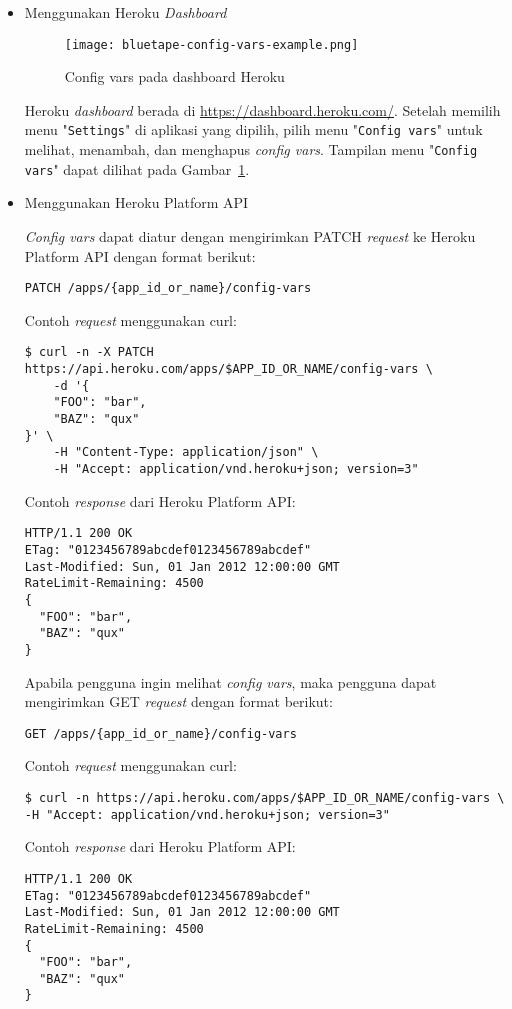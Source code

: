 \begin{itemize}
\item Menggunakan Heroku \textit{Dashboard}
\begin{figure}[H]
	\centering  
	\texttt{[image: bluetape-config-vars-example.png]}  
	\caption[Config vars pada dashboard Heroku]{Config vars pada dashboard Heroku} 
	\label{fig:bluetape-config-vars-example} 
\end{figure}

Heroku \textit{dashboard} berada di \url{https://dashboard.heroku.com/}. Setelah memilih menu "\texttt{Settings}" di aplikasi yang dipilih, pilih menu "\texttt{Config vars}" untuk melihat, menambah, dan menghapus \textit{config vars}. Tampilan menu "\texttt{Config vars}" dapat dilihat pada Gambar~\ref{fig:bluetape-config-vars-example}.

\item Menggunakan Heroku Platform API

\textit{Config vars} dapat diatur dengan mengirimkan PATCH \textit{request} ke Heroku Platform API dengan format berikut: 
\begin{lstlisting}
PATCH /apps/{app_id_or_name}/config-vars
\end{lstlisting}
Contoh \textit{request} menggunakan curl:
\begin{lstlisting}
$ curl -n -X PATCH https://api.heroku.com/apps/$APP_ID_OR_NAME/config-vars \
	-d '{
	"FOO": "bar",
	"BAZ": "qux"
}' \
	-H "Content-Type: application/json" \
	-H "Accept: application/vnd.heroku+json; version=3"
\end{lstlisting}
Contoh \textit{response} dari Heroku Platform API:
\begin{lstlisting}
HTTP/1.1 200 OK
ETag: "0123456789abcdef0123456789abcdef"
Last-Modified: Sun, 01 Jan 2012 12:00:00 GMT
RateLimit-Remaining: 4500
{
  "FOO": "bar",
  "BAZ": "qux"
}
\end{lstlisting}

Apabila pengguna ingin melihat \textit{config vars}, maka pengguna dapat mengirimkan GET \textit{request} dengan format berikut: 
\begin{lstlisting}
GET /apps/{app_id_or_name}/config-vars
\end{lstlisting}
Contoh \textit{request} menggunakan curl:
\begin{lstlisting}
$ curl -n https://api.heroku.com/apps/$APP_ID_OR_NAME/config-vars \
-H "Accept: application/vnd.heroku+json; version=3"
\end{lstlisting}
Contoh \textit{response} dari Heroku Platform API:
\begin{lstlisting}
HTTP/1.1 200 OK
ETag: "0123456789abcdef0123456789abcdef"
Last-Modified: Sun, 01 Jan 2012 12:00:00 GMT
RateLimit-Remaining: 4500
{
  "FOO": "bar",
  "BAZ": "qux"
}
\end{lstlisting}
\end{itemize}

